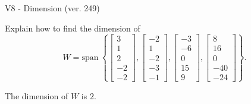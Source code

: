 \begin{exercise}
  \begin{exerciseTitle}V8 - Dimension (ver. 249)\end{exerciseTitle}
  \begin{exerciseStatement}
    Explain how to find the dimension of 
\[W=\mathrm{span}\ \left\{\left[\begin{array}{r}
3 \\
1 \\
2 \\
-2 \\
-2
\end{array}\right] , \left[\begin{array}{r}
-2 \\
1 \\
-2 \\
-3 \\
-1
\end{array}\right] , \left[\begin{array}{r}
-3 \\
-6 \\
0 \\
15 \\
9
\end{array}\right] , \left[\begin{array}{r}
8 \\
16 \\
0 \\
-40 \\
-24
\end{array}\right]\right\}.\]



  \end{exerciseStatement}
  \begin{exerciseAnswer}
   The dimension of \(W\) is  \(2\).
  


  \end{exerciseAnswer}
\end{exercise}